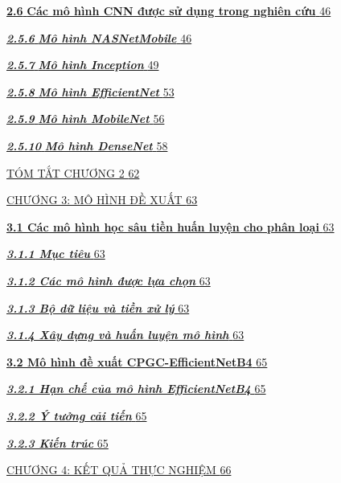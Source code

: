 \documentclass[
]{article}
\begin{document}
\hyperref[_Toc232112017]{\textbf{2.6} \textbf{Các mô hình CNN được sử
dụng trong nghiên cứu} \hyperref[_Toc232112017]{46}}

\hyperref[_Toc232112018]{\emph{\textbf{2.5.6}} \emph{\textbf{Mô hình
NASNetMobile}} \hyperref[_Toc232112018]{46}}

\hyperref[_Toc232112019]{\emph{\textbf{2.5.7}} \emph{\textbf{Mô hình
Inception}} \hyperref[_Toc232112019]{49}}

\hyperref[_Toc232112020]{\emph{\textbf{2.5.8}} \emph{\textbf{Mô hình
EfficientNet}} \hyperref[_Toc232112020]{53}}

\hyperref[_Toc232112021]{\emph{\textbf{2.5.9}} \emph{\textbf{Mô hình
MobileNet}} \hyperref[_Toc232112021]{56}}

\hyperref[_Toc232112022]{\emph{\textbf{2.5.10}} \emph{\textbf{Mô hình
DenseNet}} \hyperref[_Toc232112022]{58}}

\hyperref[tuxf3m-tux1eaft-chux1b0ux1a1ng-2]{TÓM TẮT CHƯƠNG 2
\hyperref[tuxf3m-tux1eaft-chux1b0ux1a1ng-2]{62}}

\hyperref[chux1b0ux1a1ng-3-muxf4-huxecnh-ux111ux1ec1-xuux1ea5t]{CHƯƠNG
3: MÔ HÌNH ĐỀ XUẤT
\hyperref[chux1b0ux1a1ng-3-muxf4-huxecnh-ux111ux1ec1-xuux1ea5t]{63}}

\hyperref[_Toc232112025]{\textbf{3.1 Các mô hình học sâu tiền huấn luyện
cho phân loại} \hyperref[_Toc232112025]{63}}

\hyperref[_Toc232112026]{\emph{\textbf{3.1.1 Mục tiêu}}
\hyperref[_Toc232112026]{63}}

\hyperref[_Toc232112027]{\emph{\textbf{3.1.2 Các mô hình được lựa chọn}}
\hyperref[_Toc232112027]{63}}

\hyperref[_bookmark21]{\emph{\textbf{3.1.3 Bộ dữ liệu và tiền xử lý}}
\hyperref[_bookmark21]{63}}

\hyperref[_Toc232112029]{\emph{\textbf{3.1.4 Xây dựng và huấn luyện mô
hình}} \hyperref[_Toc232112029]{63}}

\hyperref[_Toc232112030]{\textbf{3.2 Mô hình đề xuất CPGC-EfficientNetB4}
\hyperref[_Toc232112030]{65}}

\hyperref[_Toc232112031]{\emph{\textbf{3.2.1 Hạn chế của mô hình
EfficientNetB4}} \hyperref[_Toc232112031]{65}}

\hyperref[_Toc232112032]{\emph{\textbf{3.2.2 Ý tưởng cải tiến}}
\hyperref[_Toc232112032]{65}}

\hyperref[_Toc232112033]{\emph{\textbf{3.2.3 Kiến trúc}}
\hyperref[_Toc232112033]{65}}

\hyperref[chux1b0ux1a1ng-4-kux1ebft-quux1ea3-thux1ef1c-nghiux1ec7m]{CHƯƠNG
4: KẾT QUẢ THỰC NGHIỆM
\hyperref[chux1b0ux1a1ng-4-kux1ebft-quux1ea3-thux1ef1c-nghiux1ec7m]{66}}
\end{document}
